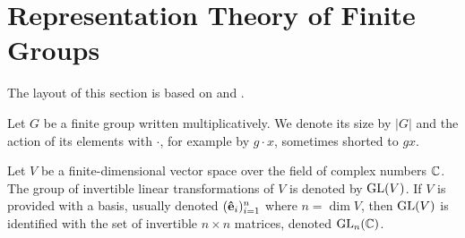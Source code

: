 \clearpage{\thispagestyle{empty}}
\section{Representation Theory of Finite Groups}

The layout of this section is based on \cite{FultonHarris} and \cite{Serre}.

Let $G$ be a finite group written multiplicatively. We denote its size by $|G|$ and the action of its elements with $\cdot$, for example by $g \cdot x$, sometimes shorted to $gx$.

Let $V$ be a finite-dimensional vector space over the field of complex numbers $\mathbb{C}$. The group of invertible linear transformations of $V$ is denoted by $\text{GL}(V)$. If $V$ is provided with a basis, usually denoted $(\mathbf{\hat{e}}_i)_{i=1}^n$ where $n = \dim V$, then $\text{GL}(V)$ is identified with the set of invertible $n \times n$ matrices, denoted $\text{GL}_n(\mathbb{C})$\cite[18.1]{DummitFoote}.


